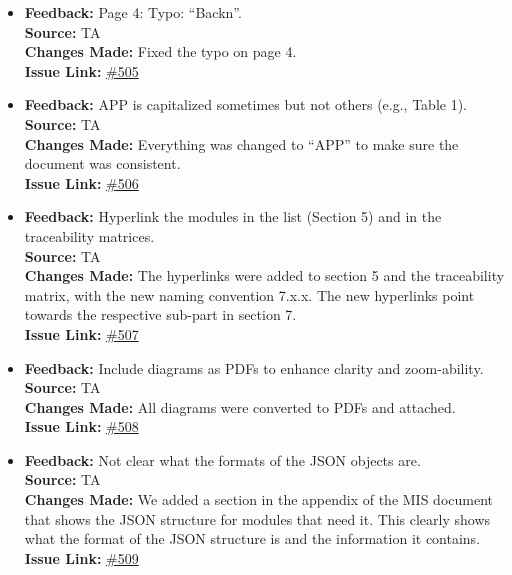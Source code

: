 \documentclass{article}
\begin{document}
\begin{itemize}
    \item
      \textbf{Feedback:} Page 4: Typo: “Backn”. \\
      \textbf{Source:} TA \\
      \textbf{Changes Made:} Fixed the typo on page 4. \\
      \textbf{Issue Link:} \href{https://github.com/parishanizam/TeleHealth/issues/505}{\#505}
    
    \item
      \textbf{Feedback:} APP is capitalized sometimes but not others (e.g., Table 1). \\
      \textbf{Source:} TA \\
      \textbf{Changes Made:} Everything was changed to “APP” to make sure the document was consistent. \\
      \textbf{Issue Link:} \href{https://github.com/parishanizam/TeleHealth/issues/506}{\#506}
    
    \item
      \textbf{Feedback:} Hyperlink the modules in the list (Section 5) and in the traceability matrices. \\
      \textbf{Source:} TA \\
      \textbf{Changes Made:} The hyperlinks were added to section 5 and the traceability matrix, with the new naming convention 7.x.x. The new hyperlinks point towards the respective sub-part in section 7. \\
      \textbf{Issue Link:} \href{https://github.com/parishanizam/TeleHealth/issues/507}{\#507}
    
    \item
      \textbf{Feedback:} Include diagrams as PDFs to enhance clarity and zoom-ability. \\
      \textbf{Source:} TA \\
      \textbf{Changes Made:} All diagrams were converted to PDFs and attached. \\
      \textbf{Issue Link:} \href{https://github.com/parishanizam/TeleHealth/issues/508}{\#508}
    
    \item
      \textbf{Feedback:} Not clear what the formats of the JSON objects are. \\
      \textbf{Source:} TA \\
      \textbf{Changes Made:} We added a section in the appendix of the MIS document that shows the JSON structure for modules that need it. This clearly shows what the format of the JSON structure is and the information it contains. \\
      \textbf{Issue Link:} \href{https://github.com/parishanizam/TeleHealth/issues/509}{\#509}
    

\end{itemize}
\end{document}
